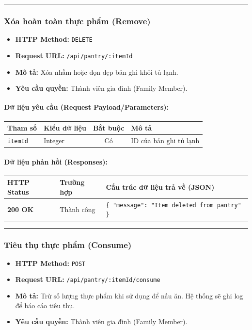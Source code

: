 \documentclass[12pt,a4paper]{article}
\begin{document}
\vskip 0.4cm
\noindent\rule{\textwidth}{0.3pt}
\vskip 0.4cm

\subsubsection{Xóa hoàn toàn thực phẩm (Remove)}
\begin{itemize}[leftmargin=*]
    \item \textbf{HTTP Method:} \texttt{DELETE}
    \item \textbf{Request URL:} \texttt{/api/pantry/:itemId}
    \item \textbf{Mô tả:} Xóa nhầm hoặc dọn dẹp bản ghi khỏi tủ lạnh.
    \item \textbf{Yêu cầu quyền:} Thành viên gia đình (Family Member).
\end{itemize}

\paragraph{Dữ liệu yêu cầu (Request Payload/Parameters):}
\begin{longtable}{|>{\raggedright\arraybackslash}p{2.8cm}|>{\raggedright\arraybackslash}p{2.2cm}|c|>{\raggedright\arraybackslash}p{7.0cm}|}
\hline
\textbf{Tham số} & \textbf{Kiểu dữ liệu} & \textbf{Bắt buộc} & \textbf{Mô tả} \\ \hline
\endhead
\texttt{itemId} & Integer & Có & ID của bản ghi tủ lạnh \\ \hline
\end{longtable}

\paragraph{Dữ liệu phản hồi (Responses):}
\begin{longtable}{|>{\raggedright\arraybackslash}p{2.8cm}|>{\raggedright\arraybackslash}p{3.2cm}|>{\raggedright\arraybackslash}p{8.0cm}|}
\hline
\textbf{HTTP Status} & \textbf{Trường hợp} & \textbf{Cấu trúc dữ liệu trả về (JSON)} \\ \hline
\endhead
\textbf{200 OK} & Thành công & \texttt{\{ "message": "Item deleted from pantry" \}} \\ \hline
\end{longtable}

\vskip 0.4cm
\noindent\rule{\textwidth}{0.3pt}
\vskip 0.4cm

\subsubsection{Tiêu thụ thực phẩm (Consume)}
\begin{itemize}[leftmargin=*]
    \item \textbf{HTTP Method:} \texttt{POST}
    \item \textbf{Request URL:} \texttt{/api/pantry/:itemId/consume}
    \item \textbf{Mô tả:} Trừ số lượng thực phẩm khi sử dụng để nấu ăn. Hệ thống sẽ ghi log để báo cáo tiêu thụ.
    \item \textbf{Yêu cầu quyền:} Thành viên gia đình (Family Member).
\end{itemize}
\end{document}
